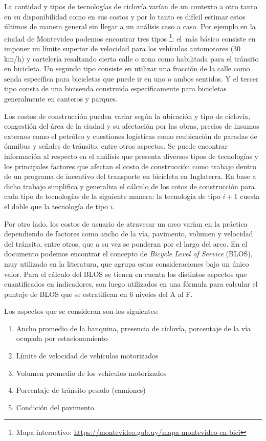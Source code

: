\documentclass{article}
\begin{document}
  La cantidad y tipos de tecnologías de ciclovía varían de un contexto a otro tanto en su disponibilidad como en sus costos y por lo tanto es difícil estimar estos últimos de manera general sin llegar a un análisis caso a caso. Por ejemplo en la ciudad de Montevideo podemos encontrar tres tipos \footnote{Mapa interactivo: \url{https://montevideo.gub.uy/mapa-montevideo-en-bici}}: el más básico consiste en imponer un límite superior de velocidad para los vehículos automotores (30 km/h) y cartelería resaltando cierta calle o zona como habilitada para el tránsito en bicicleta. Un segundo tipo consiste en utilizar una fracción de la calle como senda específica para bicicletas que puede ir en uno o ambos sentidos. Y el tercer tipo consta de una bicisenda construida específicamente para bicicletas generalmente en canteros y parques.

  Los costos de construcción pueden variar según la ubicación y tipo de ciclovía, congestión del área de la ciudad y su afectación por las obras, precios de insumos externos como el petróleo y cuestiones logísticas como reubicación de paradas de ómnibus y señales de tránsito, entre otros aspectos. Se puede encontrar información al respecto en el análisis \cite{typicalcostsofcylcing} que presenta diversos tipos de tecnologías y los principales factores que afectan el costo de construcción como trabajo dentro de un programa de incentivo del transporte en bicicleta en Inglaterra. En base a dicho trabajo \cite{baya2021} simplifica y generaliza el cálculo de los cotos de construcción para cada tipo de tecnologías de la siguiente manera: la tecnología de tipo $i+1$ cuesta el doble que la tecnología de tipo $i$.

  Por otro lado, los costos de usuario de atravesar un arco varían en la práctica dependiendo de factores como ancho de la vía, pavimento, volumen y velocidad del tránsito, entre otros, que a su vez se ponderan por el largo del arco. En el documento \cite{blos2007} podemos encontrar el concepto de {\it Bicycle Level of Service} (BLOS), muy utilizado en la literatura, que agrupa estas consideraciones bajo un único valor. Para el cálculo del BLOS se tienen en cuenta los distintos aspectos que cuantificados en indicadores, son luego utilizados en una fórmula para calcular el puntaje de BLOS que se estratifican en 6 niveles del A al F.

  Los aspectos que se consideran son los siguientes:

  \begin{enumerate}
    \item{Ancho promedio de la banquina, presencia de ciclovía, porcentaje de la vía ocupada por estacionamiento}
    \item{Límite de velocidad de vehículos motorizados}
    \item{Volumen promedio de los vehículos motorizados}
    \item{Porcentaje de tránsito pesado (camiones)}
    \item{Condición del pavimento}
  \end{enumerate}
\end{document}
